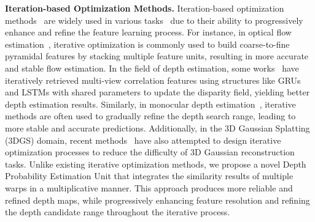 \noindent \textbf{Iteration-based Optimization Methods.}
%
%
%
\noindent Iteration-based optimization methods~\cite{adler2017solving, li2018deepim} are widely used in various tasks~\cite{he2024lotus, zhu2024addressing, chen2024virtual} due to their ability to progressively enhance and refine the feature learning process.
%
For instance, in optical flow estimation~\cite{teed2020raft, hui2018liteflownet,  yang2019volumetric, sun2018pwc, ilg2017flownet}, iterative optimization is commonly used to build coarse-to-fine pyramidal features by stacking multiple feature units, resulting in more accurate and stable flow estimation.
%
In the field of depth estimation, some works~\cite{lipson2021raft, wang2022itermvs, wang2022efficient, ma2022multiview, xu2023iterative, xu2025igev++, chen2024mocha} have iteratively retrieved multi-view correlation features using structures like GRUs and LSTMs with shared parameters to update the disparity field, yielding better depth estimation results.
%
Similarly, in monocular depth estimation~\cite{zuo2024ogni, shao2023iebins, fu2018deep}, iterative methods are often used to gradually refine the depth search range, leading to more stable and accurate predictions.
%
Additionally, in the 3D Gaussian Splatting (3DGS) domain, recent methods~\cite{wenlife, zhang2025transplat, xu2025resplat, chen2024g3r, harrison2022closer} have also attempted to design iterative optimization processes to reduce the difficulty of 3D Gaussian reconstruction tasks.
%
%
Unlike existing iterative optimization methods, we propose a novel Depth Probability Estimation Unit that integrates the similarity results of multiple warps in a multiplicative manner.
%
This approach produces more reliable and refined depth maps, while progressively enhancing feature resolution and refining the depth candidate range throughout the iterative process.




